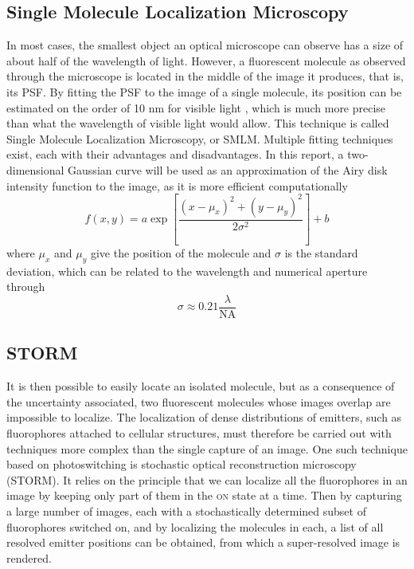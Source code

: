 \subsection{Single Molecule Localization Microscopy} \label{sec:SMLM}
In most cases, the smallest object an optical microscope can observe has a size of about half of the wavelength of light. However, a fluorescent molecule as observed through the microscope is located in the middle of the image it produces, that is, its PSF. By fitting the PSF to the image of a single molecule, its position can be estimated on the order of 10 nm for visible light \cite{douglass_notice_2023}, which is much more precise than what the wavelength of visible light would allow. This technique is called Single Molecule Localization Microscopy, or SMLM. Multiple fitting techniques exist, each with their advantages and disadvantages. In this report, a two-dimensional Gaussian curve will be used as an approximation of the Airy disk intensity function to the image, as it is more efficient \mbox{computationally \cite{douglass_notice_2023}}
\begin{equation}
    f(x, y) = a \exp \left[ \frac{(x-\mu_x)^2 + (y-\mu_y)^2}{2 \sigma^2} \right] + b
\end{equation}
where $\mu_x$ and $\mu_y$ give the position of the molecule and $\sigma$ is the standard deviation, which can be related to the wavelength and numerical aperture through \cite{zhang-appliedoptics-2007}
\begin{equation}
    \sigma \approx 0.21 \frac{\lambda}{\textrm{NA}}
    \label{eq:PSF_width_gaussian}
\end{equation}


\subsection{STORM} \label{sec:STORM}
It is then possible to easily locate an isolated molecule, but as a consequence of the uncertainty associated, two fluorescent molecules whose images overlap are impossible to localize.
The localization of dense distributions of emitters, such as fluorophores attached to cellular structures, must therefore be carried out with techniques more complex than the single capture of an image.
One such technique based on photoswitching is stochastic optical reconstruction microscopy (STORM).
It relies on the principle that we can localize all the fluorophores in an image by keeping only part of them in the \textsc{on} state  at a time.
Then by capturing a large number of images, each with a stochastically determined subset of fluorophores switched on, and by localizing the molecules in each, a list of all resolved emitter positions can be obtained, from which a super-resolved image is rendered.

